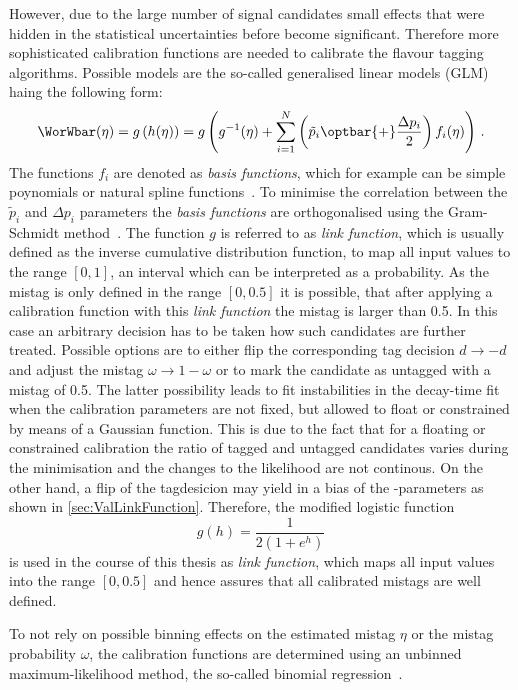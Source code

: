 However, due to the large number of \BdToDpi signal candidates small effects that were hidden in the statistical uncertainties before become significant.
Therefore more sophisticated calibration functions are needed to calibrate the flavour tagging algorithms.
Possible models are the so-called generalised linear models (GLM)~\cite{GLM} haing the following form:
\begin{equation}
\WorWbar(\eta) = g\left(h(\eta)\right) = g\left( g^{-1} (\eta) + \sum_{i=1}^{N} \left(\tilde{p}_i \kern 0.0em\optbar{\kern -0.0em +} \frac{\Delta p_i}{2}\right) f_i(\eta)\right)\,.
\end{equation}
The functions $f_i$ are denoted as \emph{basis functions}, which for example can be simple poynomials or natural spline functions~\cite{Nsplines}.
To minimise the correlation between the $\tilde{p}_i$ and $\Delta p_i$ parameters the \emph{basis functions} are orthogonalised using the Gram-Schmidt method~\cite{GramSchmidt}.
The function $g$ is referred to as \emph{link function}, which is usually defined as the inverse cumulative distribution function, to map all input values to the range $[0,1]$, \ie an interval which can be interpreted as a probability.
As the mistag is only defined in the range $[0, 0.5]$ it is possible, that after applying a calibration function with this \emph{link function} the mistag is larger than \num{0.5}.
In this case an arbitrary decision has to be taken how such candidates are further treated.
Possible options are to either flip the corresponding tag decision $d\to-d$ and adjust the mistag $\omega\to1-\omega$ or to mark the candidate as untagged with a mistag of \num{0.5}.
The latter possibility leads to fit instabilities in the decay-time fit when the calibration parameters are not fixed, but allowed to float or constrained by means of a Gaussian function.
This is due to the fact that for a floating or constrained calibration the ratio of tagged and untagged candidates varies during the minimisation and the changes to the likelihood are not continous.
On the other hand, a flip of the tagdesicion may yield in a bias of the \CP-parameters as shown in \cref{sec:ValLinkFunction}.
Therefore, the modified logistic function
\begin{equation}
g(h)=\frac{1}{2\left(1+e^h\right)}\label{eq:modlink}
\end{equation}
is used in the course of this thesis as \emph{link function}, which maps all input values into the range $[0, 0.5]$ and hence assures that all calibrated mistags are well defined.

To not rely on possible binning effects on the estimated mistag $\eta$ or the mistag probability $\omega$, the calibration functions are determined using an unbinned maximum-likelihood method, the so-called binomial regression~\cite{BinRegression}.
